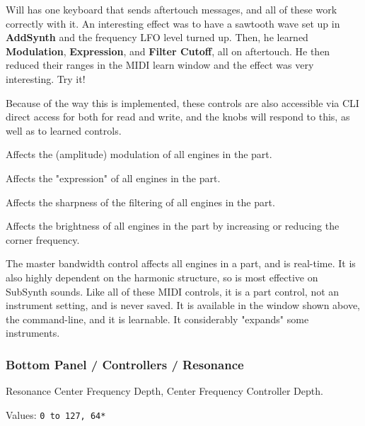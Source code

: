    Will has one keyboard that sends aftertouch messages, and all of these work
   correctly with it. An interesting effect was to have a sawtooth wave set up
   in \textbf{AddSynth} and the frequency LFO level turned up.  Then, he
   learned \textbf{Modulation}, \textbf{Expression}, and \textbf{Filter
   Cutoff}, all on aftertouch. He then reduced their ranges in the MIDI learn
   window and the effect was very interesting.  Try it!

   Because of the way this is implemented, these controls are also accessible
   via CLI direct access for both for read and write, and the knobs will
   respond to this, as well as to learned controls.

   Affects the (amplitude) modulation of all engines in the part.

   Affects the "expression" of all engines in the part.

   Affects the sharpness of the filtering of all engines in the part.

   Affects the brightness of all engines in the part by increasing or reducing
   the corner frequency.

   The master bandwidth control affects all engines in a part, and is
   real-time. It is also highly dependent on the harmonic structure, so is most
   effective on SubSynth sounds.  Like all of these MIDI controls, it is a part
   control, not an instrument setting, and is never saved.
   It is available in the window shown above, the command-line, 
   and it is learnable.
   It considerably "expands" some instruments.

\subsubsection{Bottom Panel / Controllers / Resonance}
\label{subsubsec:bottom_panel_controllers_resonance}

   \setcounter{ItemCounter}{0}      %

   Resonance Center Frequency Depth,
   Center Frequency Controller Depth.

   Values: \texttt{0 to 127, 64*}

